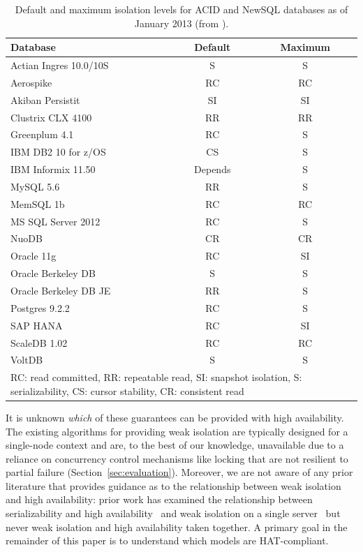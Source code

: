 \begin{table}
\begin{center}
\begin{small}
\begin{tabular}{|l|c|c|}
\hline
Database & Default & Maximum\\\hline
Actian Ingres 10.0/10S & S & S\\
Aerospike & RC & RC\\
Akiban Persistit & SI & SI\\
Clustrix CLX 4100 & RR & RR\\
Greenplum 4.1 & RC & S \\
IBM DB2 10 for z/OS & CS & S\\
IBM Informix 11.50 & Depends & S\\
MySQL 5.6 & RR & S \\
MemSQL 1b & RC & RC\\
MS SQL Server 2012 & RC & S \\
NuoDB & CR & CR\\
Oracle 11g & RC & SI\\
Oracle Berkeley DB & S & S\\
Oracle Berkeley DB JE & RR & S\\
Postgres 9.2.2 & RC & S\\
SAP HANA & RC & SI\\
ScaleDB 1.02 & RC & RC\\
VoltDB & S & S\\
\hline
\multicolumn{3}{|p{7cm}|}{{\footnotesize RC: read committed, RR: repeatable read, SI: snapshot isolation, S: serializability, CS: cursor stability, CR: consistent read}}\\\hline

\end{tabular}
\caption{Default and maximum isolation levels for ACID and NewSQL
  databases as of January 2013 (from
  \protect\cite{hat-hotos}).}\vspace{-1.5em}
\label{table:existing}
\end{small}
\end{center}
\end{table}

It is unknown \textit{which} of these guarantees can be provided with
high availability. The existing algorithms for providing weak
isolation are typically designed for a single-node context and are, to
the best of our knowledge, unavailable due to a reliance on
concurrency control mechanisms like locking that are not resilient to
partial failure (Section~\ref{sec:evaluation}). Moreover, we are not
aware of any prior literature that provides guidance as to the
relationship between weak isolation and high availability: prior work
has examined the relationship between serializability and high
availability~\cite{davidson-survey} and weak isolation on a single
server~\cite{adya, ansicritique, gray-isolation} but never weak
isolation and high availability taken together.  A primary goal in the
remainder of this paper is to understand which models are
HAT-compliant.

